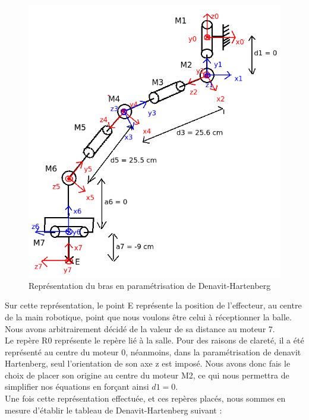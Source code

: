\begin{figure}[!htc]
	\begin{center}
		\includegraphics[scale=0.7]{images/denavit.png}
		\caption{Représentation du bras en paramétrisation de Denavit-Hartenberg} 
		\label{general}
	\end{center}
\end{figure}

Sur cette représentation, le point E représente la position de l'effecteur, au centre de la main robotique, point que nous voulons être celui à réceptionner la balle. Nous avons arbitrairement décidé de la valeur de sa distance au moteur 7.\\

Le repère R0 représente le repère lié à la salle. Pour des raisons de clareté, il a été représenté au centre du moteur 0, néanmoins, dans la paramétrisation de denavit Hartenberg, seul l'orientation de son axe z est imposé. Nous avons donc fais le choix de placer son origine au centre du moteur M2, ce qui nous permettra de simplifier nos équations en forçant ainsi $d1 = 0$.\\

Une fois cette représentation effectuée, et ces repères placés, nous sommes en mesure d'établir le tableau de Denavit-Hartenberg suivant :\\


